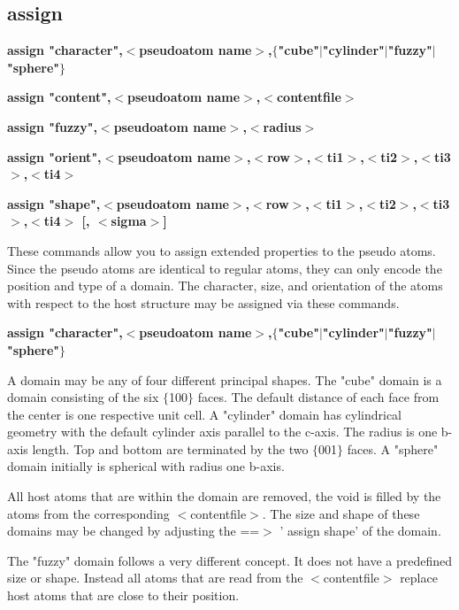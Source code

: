 \subsection*{assign}
{\bf assign "character",$ <$pseudoatom name$> $,$ \{$"cube"$| $"cylinder"$| $"fuzzy"$| $"sphere"$\} $ \par }
{\bf assign "content",$ <$pseudoatom name$> $,$ <$contentfile$> $ \par }
{\bf assign "fuzzy",$ <$pseudoatom name$> $,$ <$radius$> $ \par }
{\bf assign "orient",$ <$pseudoatom name$> $,$ <$row$> $,$ <$ti1$> $,$ <$ti2$> $,$ <$ti3$> $,$ <$ti4$> $ \par }
{\bf assign "shape",$ <$pseudoatom name$> $,$ <$row$> $,$ <$ti1$> $,$ <$ti2$> $,$ <$ti3$> $,$ <$ti4$> $ [, $ <$sigma$> $] \par }
\par
\vspace{3pt}
These commands allow you to assign extended properties to the pseudo 
atoms. Since the pseudo atoms are identical to regular atoms, they can 
only encode the position and type of a domain. The character, size, and 
orientation of the atoms with respect to the host structure may be 
assigned via these commands. 
\par
{\bf assign "character",$ <$pseudoatom name$> $,$ \{$"cube"$| $"cylinder"$| $"fuzzy"$| $"sphere"$\} $ \par }
\par
\vspace{3pt}
A domain may be any of four different principal shapes. 
The "cube" domain is a domain consisting of the six $ \{$100$\} $ faces. 
The default distance of each face from the center is one respective 
unit cell. 
A "cylinder" domain has cylindrical geometry with the default cylinder axis 
parallel to the c-axis. The radius is one b-axis length. Top and bottom 
are terminated by the two $ \{$001$\} $ faces. 
A "sphere" domain initially is spherical with radius one b-axis. 
\par
All host atoms that are within the domain are removed, the void is 
filled by the atoms from the corresponding $ <$contentfile$> $. The size and 
shape of these domains may be changed by adjusting the 
==$> $ ' assign shape' of the domain. 
\par
The "fuzzy" domain follows a very different concept. It does not have 
a predefined size or shape. Instead all atoms that are read from the 
$ <$contentfile$> $ replace host atoms that are close to their position. 
\par
